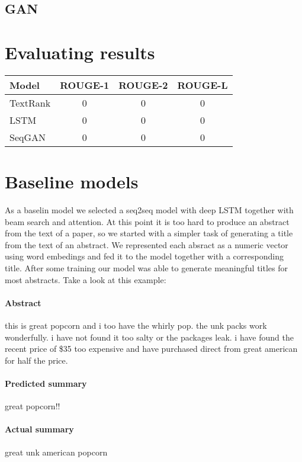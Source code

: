 \documentclass[sigplan]{acmart}
\begin{document}
\subsection{GAN}

\section{Evaluating results}

\begin{tabular}{|l|c|c|c|}
\hline
\textbf{Model} & \textbf{ROUGE-1} & \textbf{ROUGE-2} & \textbf{ROUGE-L} \\
\hline
TextRank & 0 & 0 & 0 \\
LSTM & 0 & 0 & 0 \\
SeqGAN & 0 & 0 & 0 \\
\hline
\end{tabular}

\section{Baseline models}

As a baselin model we selected a seq2seq model with deep LSTM\cite{sutskever-17} together with beam search and attention. At this point it is too hard to produce an abstract from the text of a paper, so we started with a simpler task of generating a title from the text of an abstract. We represented each absract as a numeric vector using word embedings and fed it to the model together with a corresponding title. After some training our model was able to generate meaningful titles for most abstracts. Take a look at this example:

\paragraph{Abstract} this is great popcorn and i too have the whirly pop. the unk packs work wonderfully. i have not found it too salty or the packages leak. i have found the recent price of \$35 too expensive and have purchased direct from great american for half the price.

\paragraph{Predicted summary} great popcorn!!

\paragraph{Actual summary} great unk american popcorn
\end{document}
